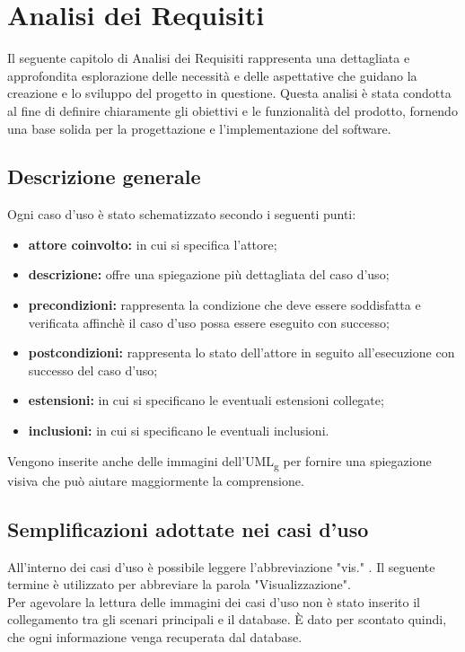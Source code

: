 \chapter{Analisi dei Requisiti}
\label{cap:analisi-requisiti}

Il seguente capitolo di Analisi dei Requisiti rappresenta una dettagliata e approfondita esplorazione delle necessità e delle aspettative che guidano la creazione e lo sviluppo del progetto in questione. Questa analisi è stata condotta al fine di definire chiaramente gli obiettivi e le funzionalità del prodotto, fornendo una base solida per la progettazione e l'implementazione del software.\\

\section{Descrizione generale}
Ogni caso d'uso è stato schematizzato secondo i seguenti punti:
\begin{itemize}
\item \textbf{attore coinvolto:} in cui si specifica l'attore;
\item \textbf{descrizione:} offre una spiegazione più dettagliata del caso d'uso; 
\item \textbf{precondizioni:} rappresenta la condizione che deve essere soddisfatta e verificata affinchè il caso d'uso possa essere eseguito con successo;
\item \textbf{postcondizioni:} rappresenta lo stato dell'attore in seguito all'esecuzione con successo del caso d'uso;
\item \textbf{estensioni:} in cui si specificano le eventuali estensioni collegate;
\item \textbf{inclusioni:} in cui si specificano le eventuali inclusioni.
\end{itemize}
Vengono inserite anche delle immagini dell'UML\textsubscript{g} per fornire una spiegazione visiva che può aiutare maggiormente la comprensione.

\section{Semplificazioni adottate nei casi d'uso}
All'interno dei casi d'uso è possibile leggere l'abbreviazione "vis." . Il seguente termine è utilizzato per abbreviare la parola "Visualizzazione".\\
Per agevolare la lettura delle immagini dei casi d'uso non è stato inserito il collegamento tra gli scenari principali e il database. È dato per scontato quindi, che ogni informazione venga recuperata dal database.\\

